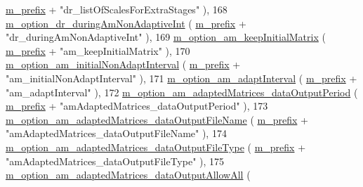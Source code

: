 \begin{DoxyCode}
      \hyperlink{class_q_u_e_s_o_1_1_m_l_sampling_level_options_a4423067de3fa689d820abeba4dc5babc}{m\_prefix} + \textcolor{stringliteral}{"dr\_listOfScalesForExtraStages"}             ),
168   \hyperlink{class_q_u_e_s_o_1_1_m_l_sampling_level_options_a8b608af9f098f4d829236c1587b6a971}{m\_option\_dr\_duringAmNonAdaptiveInt}                 (
      \hyperlink{class_q_u_e_s_o_1_1_m_l_sampling_level_options_a4423067de3fa689d820abeba4dc5babc}{m\_prefix} + \textcolor{stringliteral}{"dr\_duringAmNonAdaptiveInt"}                 ),
169   \hyperlink{class_q_u_e_s_o_1_1_m_l_sampling_level_options_a03b9660a262500e674dcc2afa77af169}{m\_option\_am\_keepInitialMatrix}                      (
      \hyperlink{class_q_u_e_s_o_1_1_m_l_sampling_level_options_a4423067de3fa689d820abeba4dc5babc}{m\_prefix} + \textcolor{stringliteral}{"am\_keepInitialMatrix"}                      ),
170   \hyperlink{class_q_u_e_s_o_1_1_m_l_sampling_level_options_a93c77cdea4092dc471e405270c5b226f}{m\_option\_am\_initialNonAdaptInterval}                (
      \hyperlink{class_q_u_e_s_o_1_1_m_l_sampling_level_options_a4423067de3fa689d820abeba4dc5babc}{m\_prefix} + \textcolor{stringliteral}{"am\_initialNonAdaptInterval"}                ),
171   \hyperlink{class_q_u_e_s_o_1_1_m_l_sampling_level_options_aaa6a4e45bd064d7b4656e71cfd71d58b}{m\_option\_am\_adaptInterval}                          (
      \hyperlink{class_q_u_e_s_o_1_1_m_l_sampling_level_options_a4423067de3fa689d820abeba4dc5babc}{m\_prefix} + \textcolor{stringliteral}{"am\_adaptInterval"}                          ),
172   \hyperlink{class_q_u_e_s_o_1_1_m_l_sampling_level_options_ac8ab2064bc916c10fa3c7bf1793869e8}{m\_option\_am\_adaptedMatrices\_dataOutputPeriod}       (
      \hyperlink{class_q_u_e_s_o_1_1_m_l_sampling_level_options_a4423067de3fa689d820abeba4dc5babc}{m\_prefix} + \textcolor{stringliteral}{"amAdaptedMatrices\_dataOutputPeriod"}        ),
173   \hyperlink{class_q_u_e_s_o_1_1_m_l_sampling_level_options_a50b0b030e51402badf96072ea3add0ba}{m\_option\_am\_adaptedMatrices\_dataOutputFileName}     (
      \hyperlink{class_q_u_e_s_o_1_1_m_l_sampling_level_options_a4423067de3fa689d820abeba4dc5babc}{m\_prefix} + \textcolor{stringliteral}{"amAdaptedMatrices\_dataOutputFileName"}      ),
174   \hyperlink{class_q_u_e_s_o_1_1_m_l_sampling_level_options_adaf47c65997276c4e7a2e5437a49f5eb}{m\_option\_am\_adaptedMatrices\_dataOutputFileType}     (
      \hyperlink{class_q_u_e_s_o_1_1_m_l_sampling_level_options_a4423067de3fa689d820abeba4dc5babc}{m\_prefix} + \textcolor{stringliteral}{"amAdaptedMatrices\_dataOutputFileType"}      ),
175   \hyperlink{class_q_u_e_s_o_1_1_m_l_sampling_level_options_a455507e07fb1494b26f4b387a72ca7b3}{m\_option\_am\_adaptedMatrices\_dataOutputAllowAll}     (

\end{DoxyCode}
